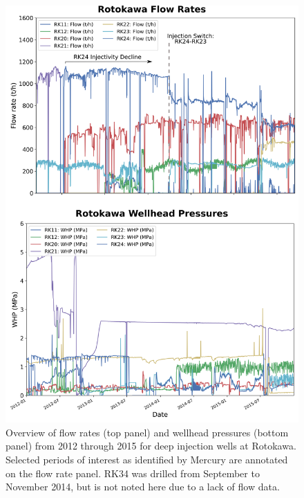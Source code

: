 \begin{figure}[h!]
\begin{center}
\includegraphics[width=0.84\columnwidth]{Chapter_1_Intro/figures/Rotokawa_overview_Intro/Rotokawa_overview_Intro_original}
\caption{{Overview of flow rates (top panel) and wellhead pressures (bottom panel)
from 2012 through 2015 for deep injection wells at Rotokawa. Selected
periods of interest as identified by Mercury are annotated on the flow
rate panel. RK34 was drilled from September to November 2014, but is not noted here due to a lack of flow data.
{\label{701773}}%
}}
\end{center}
\end{figure}


